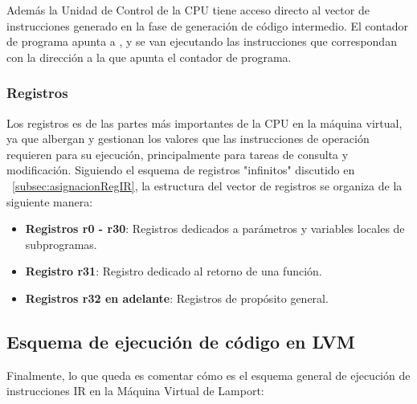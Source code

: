 Además la Unidad de Control de la CPU tiene acceso directo al vector de instrucciones generado en la fase de generación de código intermedio. El contador de programa apunta a , y se van ejecutando las instrucciones que correspondan con la dirección a la que apunta el contador de programa.

\subsubsection{Registros}\label{subsubsec:registrosLVM}
Los registros es de las partes más importantes de la CPU en la máquina virtual, ya que albergan y gestionan los valores que las instrucciones de operación requieren para su ejecución, principalmente para tareas de consulta y modificación. Siguiendo el esquema de registros "infinitos" discutido en ~\ref{subsec:asignacionRegIR}, la estructura del vector de registros se organiza de la siguiente manera:
\begin{itemize}
    \item \textbf{Registros r0 - r30}: Registros dedicados a parámetros y variables locales de subprogramas.
    \item \textbf{Registro r31}: Registro dedicado al retorno de una función.
    \item \textbf{Registros r32 en adelante}: Registros de propósito general.
\end{itemize}

\subsection{Esquema de ejecución de código en LVM}
Finalmente, lo que queda es comentar cómo es el esquema general de ejecución de instrucciones IR en la Máquina Virtual de Lamport:

